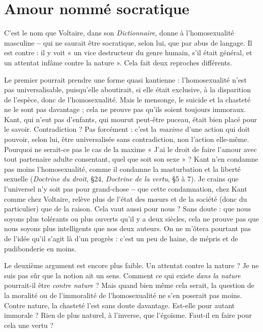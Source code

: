 \section{Amour nommé socratique}
C’est le nom que Voltaire, dans son {\it Dictionnaire},
donne à l'homosexualité masculine {\bf --}
qui ne saurait être socratique, selon lui, que par abus de langage. Il est
contre : il y voit « un vice destructeur du genre humain, s’il était général, et un
attentat infâme contre la nature ». Cela fait deux reproches différents.

Le premier pourrait prendre une forme quasi kantienne : l'homosexualité
n’est pas universalisable, puisqu'elle aboutirait, si elle était exclusive, à la disparition
de l'espèce, donc de l'homosexualité. Mais le mensonge, le suicide et la
chasteté ne le sont pas davantage ; cela ne prouve pas qu’ils soient toujours
immoraux. Kant, qui n’eut pas d’enfants, qui mourut peut-être puceau, était
bien placé pour le savoir. Contradiction ? Pas forcément : c’est la {\it maxime} d’une
action qui doit pouvoir, selon lui, être universalisée sans contradiction, non
l’action elle-même. Pourquoi ne serait-ce pas le cas de la maxime « J'ai le droit
de faire l'amour avec tout partenaire adulte consentant, quel que soit son
sexe » ? Kant n’en condamne pas moins l'homosexualité, comme il condamne
la masturbation et la liberté sexuelle ({\it Doctrine du droit}, \S 24, {\it Doctrine de la
vertu}, \S  5 à 7). Je crains que l’universel n’y soit pas pour grand-chose {\bf --} que
cette condamnation, chez Kant comme chez Voltaire, relève plus de l’état des
mœurs et de la société (donc du particulier) que de la raison. Cela vaut aussi
pour nous ? Sans doute : que nous soyons plus tolérants ou plus ouverts qu’il y
a deux siècles, cela ne prouve pas que nous soyons plus intelligents que nos
deux auteurs. On ne m’ôtera pourtant pas de l’idée qu’il s’agit là d’un progrès :
c’est un peu de haine, de mépris et de pudibonderie en moins.

Le deuxième argument est encore plus faible. Un attentat contre la nature ?
Je ne suis pas sûr que la notion ait un sens. Comment ce qui existe {\it dans la
nature} pourrait-il être {\it contre nature} ? Mais quand bien même cela serait, la
question de la moralité ou de l’immoralité de l’homosexualité ne s’en poserait
pas moins. Contre nature, la chasteté l’est sans doute davantage. Est-elle pour
autant immorale ? Rien de plus naturel, à l'inverse, que l’égoïsme. Faut-il en
faire pour cela une vertu ?


